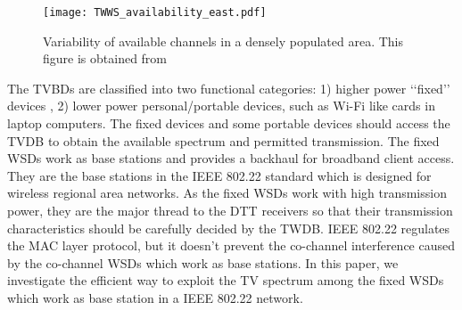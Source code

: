 \documentclass[times]{ettauth}
\theoremstyle{mytheoremstyle}
\theoremstyle{mytheoremstyle}
\theoremstyle{mytheoremstyle}
\begin{document}



\begin{figure}[h!]
  \centering
  \texttt{[image: TWWS\_availability\_east.pdf]}
  \caption{Variability of available channels in a densely populated area. This figure is obtained from \cite{googleDatabase}}
\label{variability_TVWS}
\end{figure}

The TVBDs are classified into two functional categories: 1) higher power ‘‘fixed’’ devices , 2) lower power personal/portable devices, such as Wi-Fi like cards in laptop computers.
The fixed devices and some portable devices should access the TVDB to obtain the available spectrum and permitted transmission.
%
The fixed WSDs work as base stations and provides a backhaul for broadband client access.
They are the base stations in the IEEE 802.22 standard which is designed for wireless regional area networks.
As the fixed WSDs work with high transmission power, they are the major thread to the DTT receivers so that their transmission characteristics should be carefully decided by the TWDB.
IEEE 802.22 regulates the MAC layer protocol, but it doesn't prevent the co-channel interference caused by the co-channel WSDs which work as base stations.
In this paper, we investigate the efficient way to exploit the TV spectrum among the fixed WSDs which work as base station in a IEEE 802.22 network.
\end{document}
